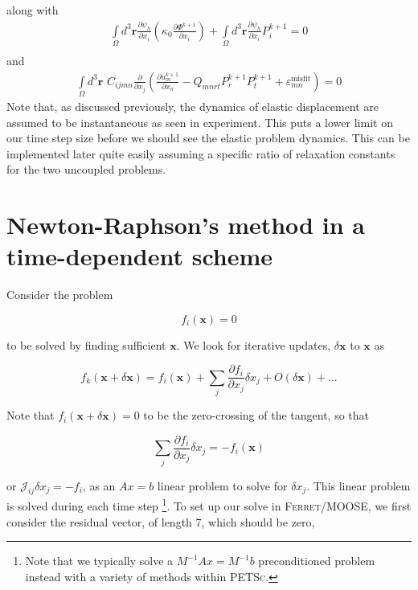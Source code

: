 \documentclass[16pt]{article} %
\begin{document}
%
along with
%
\begin{eqnarray}\nonumber
\int\limits_\Omega d^3 \textbf{r} \frac{\partial \psi_h}{\partial x_i} \left(\kappa_0 \frac{\partial \Phi^{k+1}}{\partial x_i} \right) + \int\limits_\Omega d^3 \textbf{r} \frac{\partial \psi_h}{\partial x_i} P_i^{k+1} = 0 \\ \nonumber
\end{eqnarray}
and 
\begin{eqnarray}\nonumber
\int\limits_\Omega d^3 \textbf{r} \,\,C_{ijmn} \frac{\partial}{\partial x_j} \left(\frac{\partial u^{k+1}_m}{\partial x_n} - Q_{mnrt} P_r^{k+1} P_t^{k+1}  + \varepsilon_{mn}^\mathrm{misfit}\right) = 0
\end{eqnarray}
%
Note that, as discussed previously, the dynamics of elastic displacement are assumed to be instantaneous as seen in experiment.
%
This puts a lower limit on our time step size before we should see the elastic problem dynamics. This can be implemented later quite easily assuming a specific ratio of relaxation  constants for the two uncoupled problems.
%
\newpage
\vspace*{-55pt}
\section{Newton-Raphson's method in a time-dependent scheme}

Consider the problem

$$f_i(\textbf{x}) = 0$$

to be solved by finding sufficient $\textbf{x}$. We look for iterative updates, $\delta \textbf{x}$ to $\textbf{x}$ as

$$f_k \left(\textbf{x} + \delta \textbf{x} \right) = f_i \left(\textbf{x} \right) + \sum\limits_j \frac{\partial f_i}{\partial x_j} \delta x_j + O(\delta \textbf{x}) + ...$$

Note that $f_i (\textbf{x} + \delta \textbf{x} ) = 0$ to be the zero-crossing of the tangent, so that

$$\sum\limits_j \frac{\partial f_i}{\partial x_j} \delta x_j = - f_i (\textbf{x})$$

or $\mathscr{J}_{ij} \delta x_j = - f_i$, as an $Ax = b$ linear problem to solve for $\delta x_j$. This linear problem is solved during each time step \footnote{Note that we typically solve a $M^{-1} A x = M^{-1} b$ preconditioned problem instead with a variety of methods within \textsc{PETSc}.}. 
%
To set up our solve in \textsc{Ferret}/\textsc{MOOSE}, we first consider the residual vector, of length 7, which should be zero,
\end{document}
